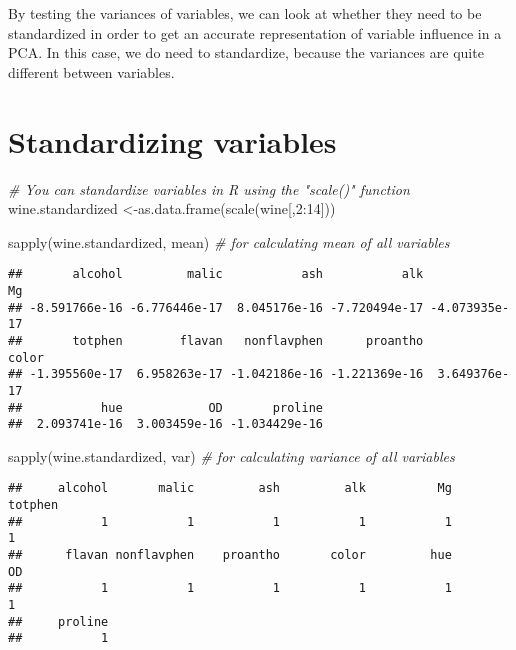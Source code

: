 \documentclass[
]{book}
\newenvironment{Shaded}{\begin{snugshade}}{\end{snugshade}}
\newcommand{\CommentTok}[1]{\textcolor[rgb]{0.56,0.35,0.01}{\textit{#1}}}
\newcommand{\DecValTok}[1]{\textcolor[rgb]{0.00,0.00,0.81}{#1}}
\newcommand{\FunctionTok}[1]{\textcolor[rgb]{0.00,0.00,0.00}{#1}}
\newcommand{\NormalTok}[1]{#1}
\newcommand{\OtherTok}[1]{\textcolor[rgb]{0.56,0.35,0.01}{#1}}
\newcommand{\SpecialCharTok}[1]{\textcolor[rgb]{0.00,0.00,0.00}{#1}}
\begin{document}
By testing the variances of variables, we can look at whether they need to be standardized in order to get an accurate representation of variable influence in a PCA. In this case, we do need to standardize, because the variances are quite different between variables.

\hypertarget{standardizing-variables}{%
\section{Standardizing variables}\label{standardizing-variables}}

\begin{Shaded}
\begin{Highlighting}[]
\CommentTok{\# You can standardize variables in R using the "scale()" function}
\NormalTok{wine.standardized }\OtherTok{\textless{}{-}}\FunctionTok{as.data.frame}\NormalTok{(}\FunctionTok{scale}\NormalTok{(wine[,}\DecValTok{2}\SpecialCharTok{:}\DecValTok{14}\NormalTok{]))}

\FunctionTok{sapply}\NormalTok{(wine.standardized, mean) }\CommentTok{\# for calculating mean of all variables}
\end{Highlighting}
\end{Shaded}

\begin{verbatim}
##       alcohol         malic           ash           alk            Mg 
## -8.591766e-16 -6.776446e-17  8.045176e-16 -7.720494e-17 -4.073935e-17 
##       totphen        flavan   nonflavphen      proantho         color 
## -1.395560e-17  6.958263e-17 -1.042186e-16 -1.221369e-16  3.649376e-17 
##           hue            OD       proline 
##  2.093741e-16  3.003459e-16 -1.034429e-16
\end{verbatim}

\begin{Shaded}
\begin{Highlighting}[]
\FunctionTok{sapply}\NormalTok{(wine.standardized, var) }\CommentTok{\# for calculating variance of all variables}
\end{Highlighting}
\end{Shaded}

\begin{verbatim}
##     alcohol       malic         ash         alk          Mg     totphen 
##           1           1           1           1           1           1 
##      flavan nonflavphen    proantho       color         hue          OD 
##           1           1           1           1           1           1 
##     proline 
##           1
\end{verbatim}
\end{document}
